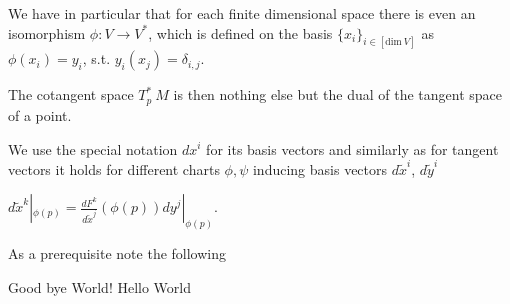 We have in particular that for each finite dimensional space there is even an isomorphism \(\phi : V \to V^\ast \),
which is defined on the basis \( \{x_i\}_{i \in [\text{dim}\ V]} \) as \( \phi(x_i) = y_i \), s.t. \( y_i(x_j) = \delta_{i,j} \).

The cotangent space \( T^\ast_p\ M \) is then nothing else but the dual of the tangent space of a point.

We use the special notation \( dx^i \) for its basis vectors and similarly as for tangent vectors it holds for different
charts \( \phi, \psi \) inducing basis vectors \( d\tilde{x}^i \), \( d\tilde{y}^i \)

\( d\tilde{x}^k|_{\phi(p)} = \frac{dF^k}{d\tilde{x}^j}(\phi(p))dy^j|_{\phi(p)} \).


As a prerequisite note the following 

Good bye World!
Hello World
